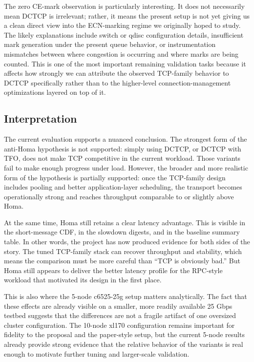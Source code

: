 \documentclass[11pt]{article}
\begin{document}
The zero CE-mark observation is particularly interesting. It does not necessarily mean DCTCP is irrelevant; rather, it means the present setup is not yet giving us a clean direct view into the ECN-marking regime we originally hoped to study. The likely explanations include switch or qdisc configuration details, insufficient mark generation under the present queue behavior, or instrumentation mismatches between where congestion is occurring and where marks are being counted. This is one of the most important remaining validation tasks because it affects how strongly we can attribute the observed TCP-family behavior to DCTCP specifically rather than to the higher-level connection-management optimizations layered on top of it.

\subsection{Interpretation}

The current evaluation supports a nuanced conclusion. The strongest form of the anti-Homa hypothesis is not supported: simply using DCTCP, or DCTCP with TFO, does not make TCP competitive in the current workload. Those variants fail to make enough progress under load. However, the broader and more realistic form of the hypothesis is partially supported: once the TCP-family design includes pooling and better application-layer scheduling, the transport becomes operationally strong and reaches throughput comparable to or slightly above Homa.

At the same time, Homa still retains a clear latency advantage. This is visible in the short-message CDF, in the slowdown digests, and in the baseline summary table. In other words, the project has now produced evidence for both sides of the story. The tuned TCP-family stack can recover throughput and stability, which means the comparison must be more careful than ``TCP is obviously bad.'' But Homa still appears to deliver the better latency profile for the RPC-style workload that motivated its design in the first place.

This is also where the 5-node c6525-25g setup matters analytically. The fact that these effects are already visible on a smaller, more readily available 25 Gbps testbed suggests that the differences are not a fragile artifact of one oversized cluster configuration. The 10-node xl170 configuration remains important for fidelity to the proposal and the paper-style setup, but the current 5-node results already provide strong evidence that the relative behavior of the variants is real enough to motivate further tuning and larger-scale validation.
\end{document}

